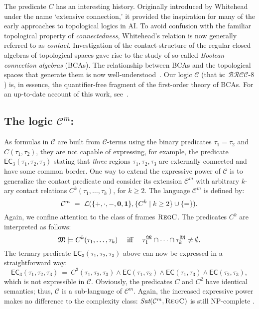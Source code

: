 \documentclass{LMCS}
\theoremstyle{plain}
\newcommand{\cBC}{\ensuremath{\mathcal{C}}}
\newcommand{\cBCm}{\ensuremath{\mathcal{C}^m}}
\newcommand{\BRCCE}{\ensuremath{\mathcal{BRCC}\text{-}8}}
\newcommand{\Sat}{\textit{Sat}}
\newcommand{\Regc}{\textsc{RegC}}
\newcommand{\NP}{\textsc{NP}}
\begin{document}
The predicate $C$ has an interesting history. Originally introduced by
Whitehead~\cite{Whitehead29} under the name `extensive connection,' it
provided the inspiration for many of the early approaches to
topological logics in AI.  To avoid confusion with the familiar
topological property of \emph{connectedness}, Whitehead's relation is
now generally referred to as \emph{contact}. Investigation of the
contact-structure of the regular closed algebras of topological spaces
gave rise to the study of so-called \emph{Boolean connection algebras}
(BCAs). The relationship between BCAs and the topological spaces that
generate them is now well-understood~\cite{Roeper97,DW05,DV1,DV2}. Our
logic $\cBC$ (that is: $\BRCCE$) is, in essence, the quantifier-free
fragment of the first-order theory of BCAs. For an up-to-date account
of this work, see~\cite{Balbianietal07}.



\subsection*{The logic $\cBC^m$: }
As formulas in $\cBC$ are built from $\cBC$-terms using the binary
predicates $\tau_1=\tau_2$ and $C(\tau_1,\tau_2)$, they are not
capable of expressing, for example, the predicate $\mathsf{EC}_3(\tau_1,\tau_2,\tau_3)$ stating that \emph{three} regions $\tau_1,\tau_2,\tau_3$ are externally connected and have some common border. One
way to extend the expressive power of $\cBC$ is to generalize the
contact predicate and consider its extension $\cBC^m$ with arbitrary
$k$-ary contact relations $C^k(\tau_1,\dots,\tau_k)$, for $k \geq 2$.
The language $\cBC^m$ is defined by:
\begin{equation*}
\cBC^m ~=~ \cL(\{+, \cdot, -, \zero, \one \}, \{C^k \mid k \geq 2 \} \cup \{=\}).
\end{equation*}
Again, we confine attention to the class of frames $\Regc$. The
predicates $C^k$ are interpreted as follows:
\begin{equation*}
\mathfrak{M} \models C^k(\tau_1, \dots, \tau_k) \quad \mbox{ iff } \quad
\tau_1^{\mathfrak{M}} \cap \cdots \cap \tau_k^{\mathfrak{M}} \neq \emptyset.
\end{equation*}
The ternary predicate $\mathsf{EC}_3(\tau_1,\tau_2,\tau_3)$ above can now be expressed in a straightforward way:
$$
\mathsf{EC}_3(\tau_1,\tau_2,\tau_3) ~=~ C^3(\tau_1,\tau_2,\tau_3) \land \mathsf{EC}(\tau_1,\tau_2) \land \mathsf{EC}(\tau_1,\tau_3) \land \mathsf{EC}(\tau_2,\tau_3),
$$
which is not expressible in $\mathcal{C}$.
Obviously, the predicates $C$ and $C^2$ have identical semantics;
thus, $\cBC$ is a sub-language of $\cBCm$. Again, the increased
expressive power makes no difference to the complexity class:
$\Sat(\cBC^m,\Regc)$ is still \NP-complete \cite{Gabelaiaetal05}.
\end{document}
